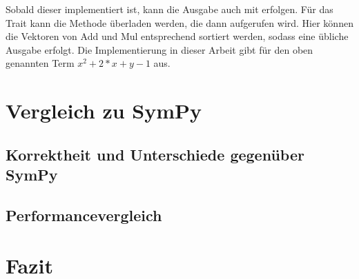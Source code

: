 \documentclass[11pt,a4paper, ngerman]{article}
\begin{document}
Sobald dieser implementiert ist, kann die Ausgabe auch mit  erfolgen. Für das Trait kann die Methode  überladen werden, die dann aufgerufen wird. Hier können die Vektoren von Add und Mul entsprechend sortiert werden, sodass eine übliche Ausgabe erfolgt. Die Implementierung in dieser Arbeit gibt für den oben genannten Term $x^2+2*x+y-1$ aus.

\newpage

\section{Vergleich zu SymPy}
\subsection{Korrektheit und Unterschiede gegenüber SymPy}
\subsection{Performancevergleich}

\newpage

\section{Fazit}
\end{document}
